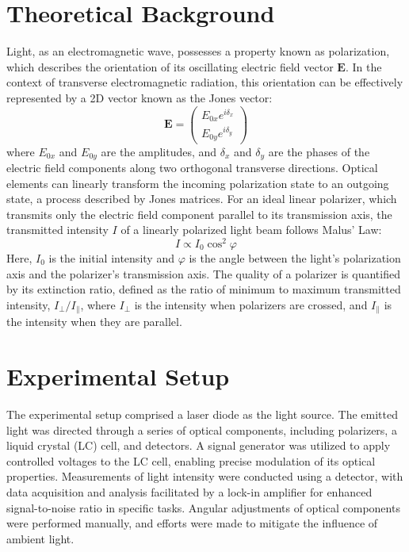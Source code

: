 \documentclass[12pt,a4paper]{article}
\begin{document}
\section{Theoretical Background}
Light, as an electromagnetic wave, possesses a property known as polarization, which describes the orientation of its oscillating electric field vector \( \mathbf{E} \). In the context of transverse electromagnetic radiation, this orientation can be effectively represented by a 2D vector known as the Jones vector:
\begin{equation*}
\mathbf{E} = \begin{pmatrix} E_{0x}e^{i\delta_x} \\ E_{0y}e^{i\delta_y} \end{pmatrix}
\end{equation*}
where \( E_{0x} \) and \( E_{0y} \) are the amplitudes, and \( \delta_x \) and \( \delta_y \) are the phases of the electric field components along two orthogonal transverse directions. Optical elements can linearly transform the incoming polarization state to an outgoing state, a process described by Jones matrices. For an ideal linear polarizer, which transmits only the electric field component parallel to its transmission axis, the transmitted intensity \( I \) of a linearly polarized light beam follows Malus' Law:
\begin{equation*}
I \propto I_0 \cos^2\varphi
\end{equation*}
Here, \( I_0 \) is the initial intensity and \( \varphi \) is the angle between the light's polarization axis and the polarizer's transmission axis. The quality of a polarizer is quantified by its extinction ratio, defined as the ratio of minimum to maximum transmitted intensity, \( I_\perp / I_\parallel \), where \( I_\perp \) is the intensity when polarizers are crossed, and \( I_\parallel \) is the intensity when they are parallel.

\section{Experimental Setup}
The experimental setup comprised a laser diode as the light source. The emitted light was directed through a series of optical components, including polarizers, a liquid crystal (LC) cell, and detectors. A signal generator was utilized to apply controlled voltages to the LC cell, enabling precise modulation of its optical properties. Measurements of light intensity were conducted using a detector, with data acquisition and analysis facilitated by a lock-in amplifier for enhanced signal-to-noise ratio in specific tasks. Angular adjustments of optical components were performed manually, and efforts were made to mitigate the influence of ambient light.
\end{document}
